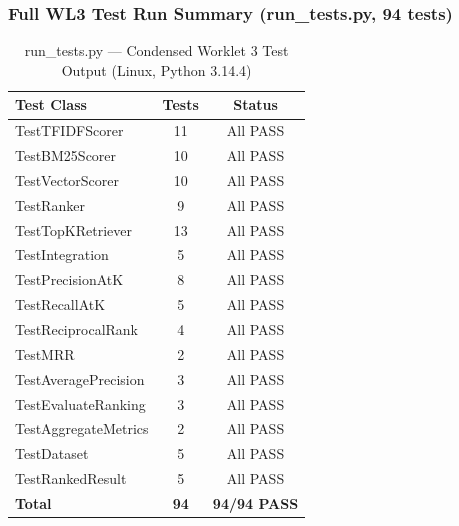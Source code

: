\documentclass[12pt]{article}
\begin{document}
\subsubsection*{Full WL3 Test Run Summary (run\_tests.py, 94 tests)}
\begin{table}[H]
\centering
\caption{run\_tests.py --- Condensed Worklet 3 Test Output (Linux, Python 3.14.4)}
\begin{tabular}{|l|c|c|}
\hline
\textbf{Test Class}         & \textbf{Tests} & \textbf{Status} \\
\hline
TestTFIDFScorer             & 11             & \textcolor{codegreen}{All PASS} \\
TestBM25Scorer              & 10             & \textcolor{codegreen}{All PASS} \\
TestVectorScorer            & 10             & \textcolor{codegreen}{All PASS} \\
TestRanker                  & 9              & \textcolor{codegreen}{All PASS} \\
TestTopKRetriever           & 13             & \textcolor{codegreen}{All PASS} \\
TestIntegration             & 5              & \textcolor{codegreen}{All PASS} \\
TestPrecisionAtK            & 8              & \textcolor{codegreen}{All PASS} \\
TestRecallAtK               & 5              & \textcolor{codegreen}{All PASS} \\
TestReciprocalRank          & 4              & \textcolor{codegreen}{All PASS} \\
TestMRR                     & 2              & \textcolor{codegreen}{All PASS} \\
TestAveragePrecision        & 3              & \textcolor{codegreen}{All PASS} \\
TestEvaluateRanking         & 3              & \textcolor{codegreen}{All PASS} \\
TestAggregateMetrics        & 2              & \textcolor{codegreen}{All PASS} \\
TestDataset                 & 5              & \textcolor{codegreen}{All PASS} \\
TestRankedResult            & 5              & \textcolor{codegreen}{All PASS} \\
\hline
\textbf{Total}              & \textbf{94}    & \textcolor{codegreen}{\textbf{94/94 PASS}} \\
\hline
\end{tabular}
\end{table}
\end{document}
